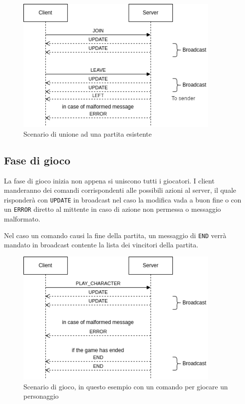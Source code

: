 \documentclass[a4paper,12pt]{article}
\begin{document}
\begin{figure}[htb]
  \centering
  \includegraphics[width=10cm]{join.png}
  \caption{Scenario di unione ad una partita esistente}%
  \label{fig:join}
\end{figure}

\subsection{Fase di gioco}

La fase di gioco inizia non appena si uniscono tutti i giocatori. I client
manderanno dei comandi corrispondenti alle possibili azioni al server, il
quale risponderà con \texttt{UPDATE} in broadcast nel caso la modifica vada
a buon fine o con un \texttt{ERROR} diretto al mittente in caso di azione
non permessa o messaggio malformato.

Nel caso un comando causi la fine della partita, un messaggio di
\texttt{END} verrà mandato in broadcast contente la lista dei vincitori della
partita.

\begin{figure}[htb]
  \centering
  \includegraphics[width=10cm]{game.png}
  \caption{Scenario di gioco, in questo esempio con un comando per giocare un personaggio}%
  \label{fig:game}
\end{figure}
\end{document}
